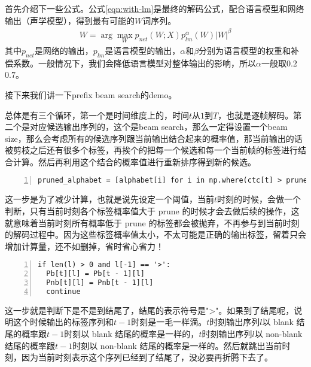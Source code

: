 {{首先介绍下一些公式。公式\ref{eqn:with-lm}是最终的解码公式，配合语言模型和网络输出（声学模型），得到最有可能的$W$词序列。
\begin{align}
\label{eqn:with-lm}
W = \arg\mathop{\max}_{W}p_{net}(W;X)p_{lm}^{\alpha}(W)|W|^{\beta}
\end{align}
其中$p_{net}$是网络的输出，$p_{lm}$是语言模型的输出，$\alpha$和$\beta$分别为语言模型的权重和补偿系数。一般情况下，我们会降低语言模型对整体输出的影响，所以$\alpha$一般取$0.2$ ~ $0.7$。

接下来我们讲一下prefix beam search的demo。

总体是有三个循环，第一个是时间维度上的，时间$t$从$1$到$T$，也就是逐帧解码。第二个是对应候选输出序列的，这个是beam search，那么一定得设置一个beam size，那么会考虑所有的候选序列跟当前输出结合起来的概率值，那当前输出的话被剪枝之后还有很多个标签，再挨个的把每一个候选和每一个当前帧的标签进行结合计算。然后再利用这个结合的概率值进行重新排序得到新的候选。

\begin{lstlisting}[language = shell, numbers=left, 
         numberstyle=\tiny,keywordstyle=\color{blue!70},
         commentstyle=\color{red!50!green!50!blue!50},frame=shadowbox,
         rulesepcolor=\color{red!20!green!20!blue!20},basicstyle=\ttfamily]
pruned_alphabet = [alphabet[i] for i in np.where(ctc[t] > prune)[0]]
\end{lstlisting}

这一步是为了减少计算，也就是说先设定一个阈值，当前$t$时刻的时候，会做一个判断，只有当前时刻各个标签概率值大于 prune 的时候才会去做后续的操作，这就意味着当前时刻所有概率低于 prune 的标签都会被抛弃，不再参与到当前时刻的解码过程中。因为这些标签概率值太小，不太可能是正确的输出标签，留着只会增加计算量，还不如删掉，省时省心省力！

\begin{lstlisting}[language = shell, numbers=left, 
         numberstyle=\tiny,keywordstyle=\color{blue!70},
         commentstyle=\color{red!50!green!50!blue!50},frame=shadowbox,
         rulesepcolor=\color{red!20!green!20!blue!20},basicstyle=\ttfamily]
if len(l) > 0 and l[-1] == '>':
  Pb[t][l] = Pb[t - 1][l]
  Pnb[t][l] = Pnb[t - 1][l]
  continue 
\end{lstlisting}

这一步就是判断下是不是到结尾了，结尾的表示符号是">"。如果到了结尾呢，说明这个时候输出的标签序列和$t-1$时刻是一毛一样滴。$t$时刻输出序列$l$以 blank 结尾的概率跟$t-1$时刻以 blank 结尾的概率是一样的，$t$时刻输出序列$l$以 non-blank 结尾的概率跟$t-1$时刻以 non-blank 结尾的概率是一样的。然后就跳出当前时刻，因为当前时刻表示这个序列已经到了结尾了，没必要再折腾下去了。
 
}}
